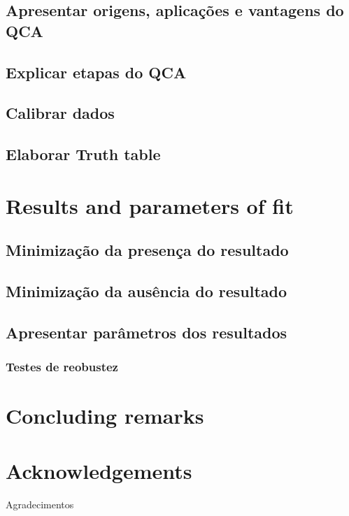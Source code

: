 \documentclass{SelfArx}
\begin{document}
\subsection*{Apresentar origens, aplicações e vantagens do QCA}
\label{sec:org21da5cf}
\subsection*{Explicar etapas do QCA}
\label{sec:org582754d}
\subsection*{Calibrar dados}
\label{sec:org7779120}
\subsection*{Elaborar Truth table}
\label{sec:org557883f}
\section*{Results and parameters of fit}
\label{sec:orgaa16a49}
\subsection*{Minimização da presença do resultado}
\label{sec:org4d9c0e8}
\subsection*{Minimização da ausência do resultado}
\label{sec:orgee6f294}
\subsection*{Apresentar parâmetros dos resultados}
\label{sec:org0b94c79}
\subsubsection*{Testes de reobustez}
\label{sec:org4ef173e}

\section*{Concluding remarks}
\label{sec:org3ae66c1}

\section*{Acknowledgements}
\label{sec:org45f16cb}

Agradecimentos


\printbibliography
\end{document}
